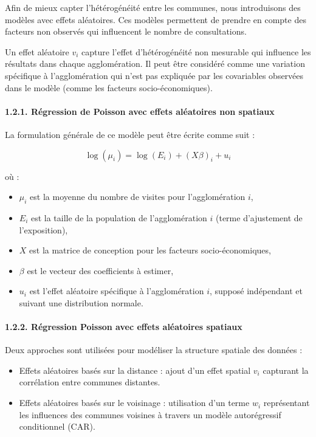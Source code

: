 \documentclass[
]{article}
\providecommand{\tightlist}{%
  \setlength{\itemsep}{0pt}\setlength{\parskip}{0pt}}
\begin{document}
Afin de mieux capter l'hétérogénéité entre les communes, nous
introduisons des modèles avec effets aléatoires. Ces modèles permettent
de prendre en compte des facteurs non observés qui influencent le nombre
de consultations.

Un effet aléatoire \(v_i\) capture l'effet d'hétérogénéité non mesurable
qui influence les résultats dans chaque agglomération. Il peut être
considéré comme une variation spécifique à l'agglomération qui n'est pas
expliquée par les covariables observées dans le modèle (comme les
facteurs socio-économiques).

\paragraph{1.2.1. Régression de Poisson avec effets aléatoires non
spatiaux}\label{ruxe9gression-de-poisson-avec-effets-aluxe9atoires-non-spatiaux}

La formulation générale de ce modèle peut être écrite comme suit :

\[
\log(\mu_i) = \log(E_i) + (X\beta)_i + u_i
\]

où :

\begin{itemize}
\tightlist
\item
  \(\mu_i\) est la moyenne du nombre de visites pour l'agglomération
  \(i\),
\item
  \(E_i\) est la taille de la population de l'agglomération \(i\) (terme
  d'ajustement de l'exposition),
\item
  \(X\) est la matrice de conception pour les facteurs
  socio-économiques,
\item
  \(\beta\) est le vecteur des coefficients à estimer,
\item
  \(u_i\) est l'effet aléatoire spécifique à l'agglomération \(i\),
  supposé indépendant et suivant une distribution normale.
\end{itemize}

\paragraph{1.2.2. Régression Poisson avec effets aléatoires
spatiaux}\label{ruxe9gression-poisson-avec-effets-aluxe9atoires-spatiaux}

Deux approches sont utilisées pour modéliser la structure spatiale des
données :

\begin{itemize}
\item
  Effets aléatoires basés sur la distance : ajout d'un effet spatial
  \(v_i\) capturant la corrélation entre communes distantes.
\item
  Effets aléatoires basés sur le voisinage : utilisation d'un terme
  \(w_i\) représentant les influences des communes voisines à travers un
  modèle autorégressif conditionnel (CAR).
\end{itemize}
\end{document}
